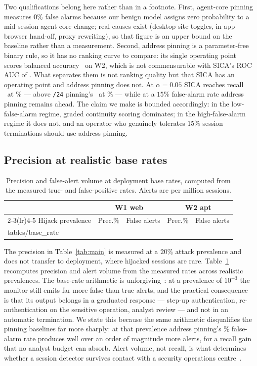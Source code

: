 \documentclass[conference]{IEEEtran}
\makeatletter
\newcommand{\tabbody}[1]{\@@input #1 }
\makeatother
\begin{document}
Two qualifications belong here rather than in a footnote.  First, agent-core
pinning measures $0\%$ false alarms because our benign model assigns zero
probability to a mid-session agent-core change; real causes exist (desktop-site
toggles, in-app browser hand-off, proxy rewriting), so that figure is an upper
bound on the baseline rather than a measurement.  Second, address pinning is a
parameter-free binary rule, so it has no ranking curve to compare: its single
operating point scores balanced accuracy \PinIpBalAccApt\ on W2, which is not
commensurable with SICA's ROC AUC of \aucApt.  What separates them is not ranking
quality but that SICA has an operating point and address pinning does not.  At
$\alpha=0.05$ SICA reaches recall \recAlphaFiveWeb\ at \fprAlphaFiveWeb\% ---
above \texttt{/24} pinning's \PinTwentyFourRecallWeb\ at
\PinTwentyFourFprWeb\% --- while at a $15\%$ false-alarm rate address pinning
remains ahead.  The claim we make is bounded accordingly: in the
low-false-alarm regime, graded continuity scoring dominates; in the
high-false-alarm regime it does not, and an operator who genuinely tolerates
$15\%$ session terminations should use address pinning.

\subsection{Precision at realistic base rates}

\begin{table}[t]
\caption{Precision and false-alert volume at deployment base rates, computed
from the measured true- and false-positive rates. Alerts are per million
sessions.}
\label{tab:baserate}
\centering\footnotesize
\begin{tabular}{lrrrr}
\toprule
& \multicolumn{2}{c}{W1 web} & \multicolumn{2}{c}{W2 apt}\\
\cmidrule(lr){2-3}\cmidrule(lr){4-5}
Hijack prevalence & Prec.\% & False alerts & Prec.\% & False alerts\\
\midrule
\tabbody{tables/base_rate}
\bottomrule
\end{tabular}
\end{table}

The precision in Table~\ref{tab:main} is measured at a $20\%$ attack prevalence
and does not transfer to deployment, where hijacked sessions are rare.
Table~\ref{tab:baserate} recomputes precision and alert volume from the measured
rates across realistic prevalences.  The base-rate arithmetic is
unforgiving~\cite{axelsson2000baserate}: at a prevalence of $10^{-3}$ the
monitor still emits far more false than true alerts, and the practical
consequence is that its output belongs in a graduated response --- step-up
authentication, re-authentication on the sensitive operation, analyst review ---
and not in an automatic termination.  We state this because the same arithmetic
disqualifies the pinning baselines far more sharply: at that prevalence address
pinning's \PinIpFprWeb\% false-alarm rate produces well over an order of
magnitude more alerts, for a recall gain that no analyst budget can absorb.  Alert volume, not
recall, is what determines whether a session detector survives contact with a
security operations centre~\cite{tariq2025alertfatigue}.
\end{document}
